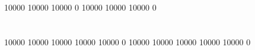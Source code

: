 \documentclass[final,nobiblatex]{cskkuproject}
\begin{document}
\makecover
\makeinnercover
\frontmatter

\begin{abstractTH}

\end{abstractTH}

\begin{abstractEN}

\end{abstractEN}

\begin{acknowledgement}

\end{acknowledgement}

\makecontents         %

\mainmatter

\chapter{\chapteronetitle}      %


 10000 10000 10000 0
 10000 10000 10000 0

\chapter{\chaptertwotitle}      %


 10000 10000 10000 10000 10000 0
 10000 10000 10000 10000 10000 0

\chapter{\chapterthreetitle}    %

\end{document}
